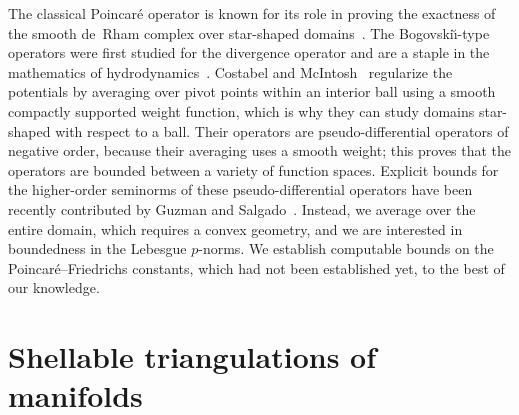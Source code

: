 \documentclass[10pt,a4paper]{article}
\begin{document}
\begin{remark} \label{remark:reg_Poinc_Bog}
    The classical Poincar\'e operator is known for its role in proving the exactness of the smooth de~Rham complex over star-shaped domains~\cite{lee2012smooth}.
    The Bogovski\u{\i}-type operators were first studied for the divergence operator and are a staple in the mathematics of hydrodynamics~\cite{bogovskii1979solution}.
    Costabel and McIntosh~\cite{costabel2010bogovskiui} regularize the potentials by averaging over pivot points within an interior ball using a smooth compactly supported weight function, 
    which is why they can study domains star-shaped with respect to a ball. 
    Their operators are pseudo-differential operators of negative order, 
    because their averaging uses a smooth weight; this proves that the operators are bounded between a variety of function spaces. 
    Explicit bounds for the higher-order seminorms of these pseudo-differential operators 
    have been recently contributed by Guzman and Salgado~\cite{guzman2021estimation}. 
    Instead, we average over the entire domain, which requires a convex geometry, 
    and we are interested in boundedness in the Lebesgue $p$-norms. 
    We establish computable bounds on the Poincar\'e--Friedrichs constants,
    which had not been established yet, to the best of our knowledge. 
\end{remark}












































\section{Shellable triangulations of manifolds}\label{section:advancedtriangulations}
\end{document}

